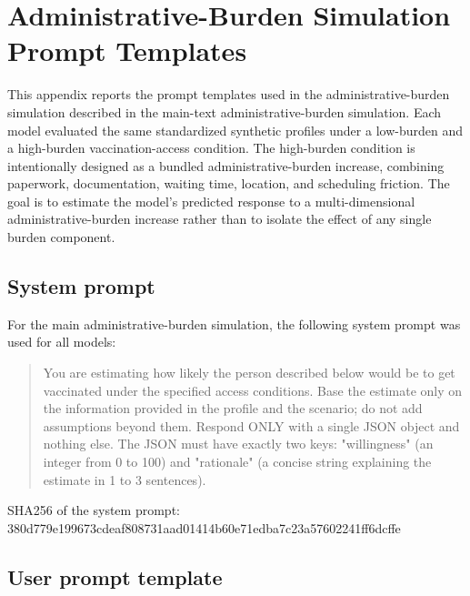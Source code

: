\documentclass[11pt]{article}
\begin{document}
\clearpage   %
\section{Administrative-Burden Simulation Prompt Templates}
\label{app:burden-prompts}

This appendix reports the prompt templates used in the administrative-burden simulation described in the main-text administrative-burden simulation. Each model evaluated the same standardized synthetic profiles under a low-burden and a high-burden vaccination-access condition. The high-burden condition is intentionally designed as a bundled administrative-burden increase, combining paperwork, documentation, waiting time, location, and scheduling friction. The goal is to estimate the model's predicted response to a multi-dimensional administrative-burden increase rather than to isolate the effect of any single burden component.

\subsection*{System prompt}

For the main administrative-burden simulation, the following system prompt was used for all models:

\begin{quote}
You are estimating how likely the person described below would be to get vaccinated under the specified access conditions. Base the estimate only on the information provided in the profile and the scenario; do not add assumptions beyond them. Respond ONLY with a single JSON object and nothing else. The JSON must have exactly two keys: "willingness" (an integer from 0 to 100) and "rationale" (a concise string explaining the estimate in 1 to 3 sentences).

\end{quote}
\begin{flushleft}
{\footnotesize SHA256 of the system prompt:}\\
{\footnotesize\ttfamily 380d779e199673cdeaf808731aad01414b60e71edba7c23a57602241ff6dcffe}
\end{flushleft}
\begin{quote}
\end{quote}

\subsection*{User prompt template}
\end{document}
